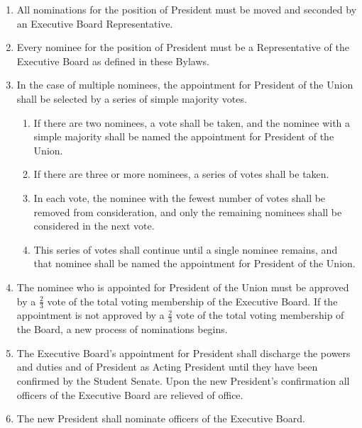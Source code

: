 \begin{enumerate}
    \item All nominations for the position of President must be moved and seconded by an Executive Board Representative.

    \item Every nominee for the position of President must be a Representative of the Executive Board as defined in these Bylaws.

    \item In the case of multiple nominees, the appointment for President of the Union shall be selected by a series of simple majority votes.
    \begin{enumerate}
        \item If there are two nominees, a vote shall be taken, and the nominee with a simple majority shall be named the appointment for President of the Union.
        \item If there are three or more nominees, a series of votes shall be taken.
        \item In each vote, the nominee with the fewest number of votes shall be removed from consideration, and only the remaining nominees shall be considered in the next vote.
        \item This series of votes shall continue until a single nominee remains, and that nominee shall be named the appointment for President of the Union.
    \end{enumerate}

    \item The nominee who is appointed for President of the Union must be approved by a $\frac{2}{3}$ vote of the total voting membership of the Executive Board. If the appointment is not approved by a $\frac{2}{3}$ vote of the total voting membership of the Board, a new process of nominations begins.

    \item The Executive Board’s appointment for President shall discharge the powers and duties and of President as Acting President until they have been confirmed by the Student Senate. Upon the new President’s confirmation all officers of the Executive Board are relieved of office.

    \item The new President shall nominate officers of the Executive Board.

\end{enumerate}

